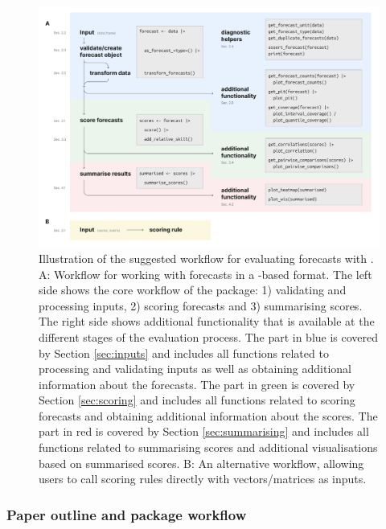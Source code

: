 \documentclass[
]{jss}
\begin{document}
\begin{CodeChunk}
\begin{figure}[!h]

{\centering \includegraphics[width=1\linewidth]{../../man/figures/workflow} 

}

\caption{Illustration of the suggested workflow for evaluating forecasts with . A: Workflow for working with forecasts in a -based format. The left side shows the core workflow of the package: 1) validating and processing inputs, 2) scoring forecasts and 3) summarising scores. The right side shows additional functionality that is available at the different stages of the evaluation process. The part in blue is covered by Section \ref{sec:inputs} and includes all functions related to processing and validating inputs as well as obtaining additional information about the forecasts. The part in green is covered by Section \ref{sec:scoring} and includes all functions related to scoring forecasts and obtaining additional information about the scores. The part in red is covered by Section \ref{sec:summarising} and includes all functions related to summarising scores and additional visualisations based on summarised scores. B: An alternative workflow, allowing users to call scoring rules directly with vectors/matrices as inputs.}\label{fig:workflow-scoringutils}
\end{figure}
\end{CodeChunk}

\subsubsection{Paper outline and package
workflow}\label{paper-outline-and-package-workflow}
\end{document}
